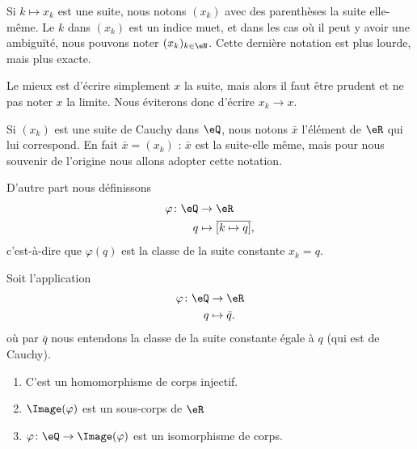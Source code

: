 \begin{normaltext}      \label{NORMooWBYNooBQaPPk}
    Si \( k\mapsto x_k\) est une suite, nous notons \( (x_k)\) avec des parenthèses la suite elle-même. Le \( k\) dans \( (x_k)\) est un indice muet, et dans les cas où il peut y avoir une ambiguïté, nous pouvons noter \( (x_k)_{k\in \eN}\). Cette dernière notation est plus lourde, mais plus exacte.
    
    Le mieux est d'écrire simplement \( x\) la suite, mais alors il faut être prudent et ne pas noter \( x\) la limite. Nous éviterons donc d'écrire \( x_k\to x\).

    Si \( (x_k)\) est une suite de Cauchy dans \( \eQ\), nous notons \( \bar x\) l'élément de \( \eR\) qui lui correspond. En fait \( \bar x=(x_k)\) : \( \bar x\) est la suite-elle même, mais pour nous souvenir de l'origine nous allons adopter cette notation.

    D'autre part nous définissons
    \begin{equation}
        \begin{aligned}
            \varphi\colon \eQ&\to \eR \\
            q&\mapsto \overline{ [k\mapsto q]},
        \end{aligned}
    \end{equation}
    c'est-à-dire que \( \varphi(q)\) est la classe de la suite constante \( x_k=q\).
\end{normaltext}

\begin{proposition}     \label{PropooEPFCooMtDOfP}
    Soit l'application
    \begin{equation}
        \begin{aligned}
            \varphi\colon \eQ&\to \eR \\
            q&\mapsto \bar q .
        \end{aligned}
    \end{equation}
    où par \( \bar q\) nous entendons la classe de la suite constante égale à \( q\) (qui est de Cauchy).
    \begin{enumerate}
        \item
            C'est un homomorphisme de corps injectif.
        \item
            \( \Image(\varphi)\) est un sous-corps de \( \eR\)
        \item
            \( \varphi\colon \eQ\to \Image(\varphi)\) est un isomorphisme de corps.
    \end{enumerate}
\end{proposition}

